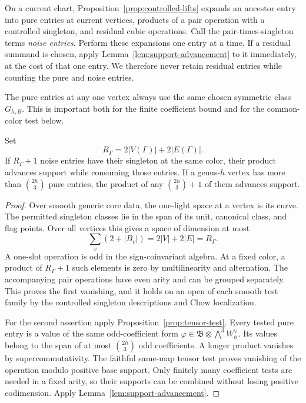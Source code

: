 On a current chart, Proposition~\ref{prop:controlled-lifts} expands an
ancestor entry into pure entries at current vertices, products of a pair
operation with a controlled singleton, and residual cubic operations.
Call the pair-times-singleton terms \emph{noise entries}.
Perform these expansions one entry at a time.  If a residual summand is
chosen, apply Lemma~\ref{lem:support-advancement} to it immediately, at
the cost of that one entry.  We therefore never retain residual entries
while counting the pure and noise entries.

The pure entries at any one vertex always use the same chosen symmetric
class \(G_{h,B}\).  This is important both for the finite coefficient
bound and for the common-color test below.

\begin{lemma}
\label{lem:elementary-entry-tests}
Set
\[
 R_\Gamma=2|V(\Gamma)|+2|E(\Gamma)|.
\]
If \(R_\Gamma+1\) noise entries have their singleton at the same color,
their product advances support while consuming those entries.
If a genus-\(h\) vertex has more than \(\binom{2h}{3}\) pure entries,
the product of any \(\binom{2h}{3}+1\) of them advances support.
\end{lemma}

\begin{proof}
Over smooth generic core data, the one-light space at a vertex is its
curve.  The permitted singleton classes lie in the span of its unit,
canonical class, and flag points.  Over all vertices this gives a space
of dimension at most
\[
 \sum_v(2+|B_v|)=2|V|+2|E|=R_\Gamma.
\]
A one-slot operation is odd in the sign-coinvariant algebra.
At a fixed color, a product of \(R_\Gamma+1\) such elements is zero by
multilinearity and alternation.  The accompanying pair operations have
even arity and can be grouped separately.  This proves the first
vanishing, and it holds on an open of each smooth test family by the
controlled singleton descriptions and Chow localization.

For the second assertion apply Proposition~\ref{prop:tensor-test}.
Every tested pure entry is a value of the same odd-coefficient form
\(\varphi\in\mathfrak B\otimes\bigwedge^3 W_h^\vee\).
Its values belong to the span of at most \(\binom{2h}{3}\) odd
coefficients.  A longer product vanishes by supercommutativity.
The faithful same-map tensor test proves vanishing of the operation
modulo positive base support.  Only finitely many coefficient tests are
needed in a fixed arity, so their supports can be combined without
losing positive codimension.  Apply
Lemma~\ref{lem:support-advancement}.
\end{proof}

